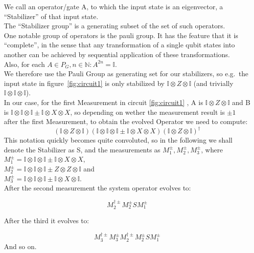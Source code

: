We call an operator/gate A, to which the input state is an 
eigenvector, a ``Stabilizer'' of that input state. \\
The ``Stabilizer group'' is a generating subset of the set
of such operators.\\
One notable group of operators is the pauli group. It has the
feature that it is ``complete'', in the sense that any
transformation of a single qubit states into another can be
achieved by sequential application of these transformations.\\
Also, for each $A\in P_{G}, n\in \mathbb{N}: A^{2n}=\mathbb{I}$. 
\\
We therefore use the Pauli Group as generating set for our
stabilizers,
so e.g.\ the input state in figure~\ref{fig:circuit1} is only 
stabilized by $\mathbb{I} \otimes Z \otimes \mathbb{I}$ 
(and trivially $\mathbb{I} \otimes \mathbb{I} \otimes \mathbb{I}$).\\
In our case, for the first Measurement in circuit \ref{fig:circuit1}
, A is $\mathbb{I}\otimes Z\otimes\mathbb{I}$ and B is
$\mathbb{I}\otimes\mathbb{I}\otimes\mathbb{I}\pm
	\mathbb{I}\otimes X \otimes X$, so depending on wether
the measurement result is $\pm1$ after the first Measurement,
to obtain the evolved Operator we need to compute:
\begin{equation}
	(\mathbb{I}\otimes Z\otimes\mathbb{I})
	(\mathbb{I}\otimes\mathbb{I}\otimes\mathbb{I}\pm
	\mathbb{I}\otimes X \otimes X) 
	(\mathbb{I}\otimes Z\otimes\mathbb{I})^{\dag}
\end{equation}
This notation quickly becomes quite convoluted, so in the 
following we shall denote the Stabilizer as S, and the 
measurements as $M_{1}^{\pm},M_{2}^{\pm},M_{3}^{\pm}$, where
$M_{1}^{\pm}=\mathbb{I}\otimes\mathbb{I}\otimes\mathbb{I}\pm
\mathbb{I}\otimes X \otimes X$,\\ 
$M_{2}^{\pm}=\mathbb{I}\otimes\mathbb{I}\otimes\mathbb{I}\pm
Z \otimes Z \otimes \mathbb{I}$ and \\
$M_{3}^{\pm}=\mathbb{I}\otimes\mathbb{I}\otimes\mathbb{I}\pm
\mathbb{I} \otimes X \otimes \mathbb{I}$. \\
After the second measurement the system operator evolves to:

\begin{equation}
	M_{2}^{\dagger\pm}M_{2}^{\pm}SM_{1}^{\pm}
\end{equation}

After the third it evolves to:

\begin{equation}
	M_{3}^{\dagger\pm}M_{3}^{\pm}M_{2}^{\dagger\pm}M_{2}^{\pm}SM_{1}^{\pm}
\end{equation}
And so on.









